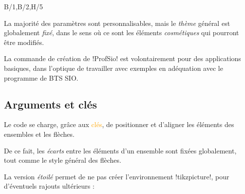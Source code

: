 \documentclass[french,a4paper,11pt]{article}
\newcommand\Cle[1]{{\small\sffamily\textlangle \textcolor{orange}{#1}\textrangle}}
\begin{document}
{{\begin{DemoCode}

\end{DemoCode}

\begin{DemoCode}[]
%
	{B/1,B/2,H/5}
\end{DemoCode}

\begin{warningblock}
La majorité des paramètres sont personnalisables, mais le \textit{thème} général est globalement \textit{fixé}, dans le sens où ce sont les éléments \textit{cosmétiques} qui pourront être modifiés.

\smallskip

La commande de création de \packagetex!ProfSio! est volontairement pour des applications basiques, dans l'optique de travailler avec exemples en adéquation avec le programme de BTS SIO.
\end{warningblock}

\subsection{Arguments et clés}

\begin{DemoCode}

\end{DemoCode}

\begin{noteblock}
Le code se charge, grâce aux \Cle{clés}, de positionner et d'aligner les éléments des ensembles et les flèches.

De ce fait, les \textit{écarts} entre les éléments d'un ensemble sont fixées globalement, tout comme le style général des flèches.
\end{noteblock}

\begin{tipblock}
La version \textit{étoilé} permet de ne pas créer l'environnement \motcletex!tikzpicture!, pour d'éventuels rajouts ultérieurs :


\end{tipblock}}}
\end{document}
